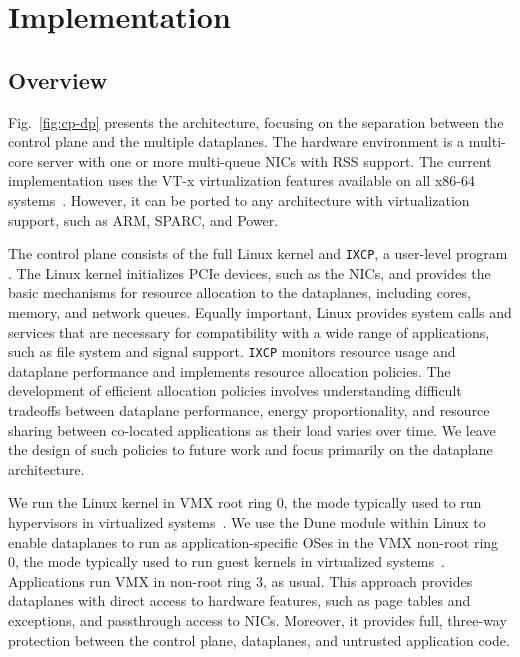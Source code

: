  
\section{\ix Implementation}
\label{sec:impl}





\subsection{Overview}
\label{sec:impl:overview}

Fig.~\ref{fig:cp-dp} presents the \ix architecture, focusing on the
separation between the control plane and the multiple dataplanes.  The
hardware environment is a multi-core server with one or more
multi-queue NICs with RSS support. The current \ix implementation uses
the VT-x virtualization features available on all x86-64
systems~\cite{DBLP:journals/computer/UhligNRSMABKLS05}. However, it
can be ported to any architecture with virtualization support, such as
ARM, SPARC, and Power.   

The \ix control plane consists of the full Linux kernel and
\texttt{IXCP}, a user-level program . The Linux kernel
initializes PCIe devices, such as the NICs, and provides the basic
mechanisms for resource allocation to the dataplanes, including cores,
memory, and network queues. Equally important, Linux provides system
calls and services that are necessary for compatibility with a wide
range of applications, such as file system and signal
support. \texttt{IXCP} monitors resource usage and dataplane
performance and implements resource allocation policies. The
development of efficient allocation policies involves understanding
difficult tradeoffs between dataplane performance, energy
proportionality, and resource sharing between co-located applications
as their load varies over time. We leave the design of such policies
to future work and focus primarily on the \ix dataplane architecture.

We run the Linux kernel in VMX root ring 0, the mode typically used to
run hypervisors in virtualized
systems~\cite{DBLP:journals/computer/UhligNRSMABKLS05}. We use the
Dune module within Linux to enable dataplanes to run as
application-specific OSes in the VMX non-root ring 0, the mode
typically used to run guest kernels in virtualized
systems~\cite{dune}.  Applications run VMX in non-root ring 3, as
usual.  This approach provides dataplanes with direct access to
hardware features, such as page tables and exceptions, and passthrough
access to NICs. Moreover, it provides full, three-way protection
between the control plane, dataplanes, and untrusted application code.

